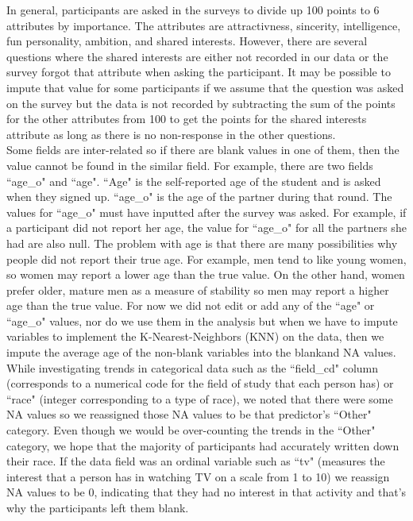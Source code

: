 \documentclass{article}
\begin{document}

In general, participants are asked in the surveys to divide up 100 points to 6 attributes by importance.  The attributes are attractivness, sincerity, intelligence, fun personality, ambition, and shared interests.  However, there are several questions where the shared interests are either not recorded in our data or the survey forgot that attribute when asking the participant.  It may be possible to impute that value for some participants if we assume that the question was asked on the survey but the data is not recorded by subtracting the sum of the points for the other attributes from 100 to get the points for the shared interests attribute as long as there is no non-response in the other questions.\\

Some fields are inter-related so if there are blank values in one of them, then the value cannot be found in the similar field. For example, there are two fields ``age\_o" and ``age". ``Age" is the self-reported age of the student and is asked when they signed up. ``age\_o" is the age of the partner during that round.  The values for ``age\_o" must have inputted after the survey was asked.  For example, if a participant did not report her age, the value for ``age\_o" for all the partners she had are also null.  The problem with age is that there are many possibilities why people did not report their true age.  For example, men tend to like young women, so women may report a lower age than the true value.  On the other hand, women prefer older, mature men as a measure of stability so men may report a higher age than the true value.  For now we did not edit or add any of the ``age" or ``age\_o" values, nor do we use them in the analysis but when we have to impute variables to implement the K-Nearest-Neighbors (KNN) on the data, then we impute the average age of the non-blank variables into the blankand NA values.\\

While investigating trends in categorical data such as the ``field\_cd" column (corresponds to a numerical code for the field of study that each person has) or ``race" (integer corresponding to a type of race), we noted that there were some NA values so we reassigned those NA values to be that predictor's ``Other" category.  Even though we would be over-counting the trends in the ``Other" category, we hope that the majority of participants had accurately written down their race.  If the data field was an ordinal variable such as ``tv" (measures the interest that a person has in watching TV on a scale from 1 to 10) we reassign NA values to be 0, indicating that they had no interest in that activity and that's why the participants left them blank.\\
\end{document}
